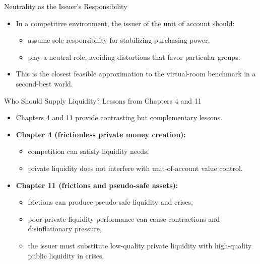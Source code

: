 \documentclass[11pt,aspectratio=169]{beamer}
\begin{document}
\begin{frame}{Neutrality as the Issuer’s Responsibility}
\small
\begin{itemize}
  \item In a competitive environment, the issuer of the unit of account should:
  \begin{itemize}
    \item assume sole responsibility for stabilizing purchasing power,
    \item play a neutral role, avoiding distortions that favor particular groups.
  \end{itemize}
  \item This is the closest feasible approximation to the virtual-room benchmark in a second-best world.
\end{itemize}
\end{frame}

\begin{frame}{Who Should Supply Liquidity? Lessons from Chapters 4 and 11}
\small
\begin{itemize}
  \item Chapters 4 and 11 provide contrasting but complementary lessons.
  \item \textbf{Chapter 4 (frictionless private money creation):}
  \begin{itemize}
    \item competition can satisfy liquidity needs,
    \item private liquidity does not interfere with unit-of-account value control.
  \end{itemize}
  \item \textbf{Chapter 11 (frictions and pseudo-safe assets):}
  \begin{itemize}
    \item frictions can produce pseudo-safe liquidity and crises,
    \item poor private liquidity performance can cause contractions and disinflationary pressure,
    \item the issuer must substitute low-quality private liquidity with high-quality public liquidity in crises.
  \end{itemize}
\end{itemize}
\end{frame}
\end{document}
